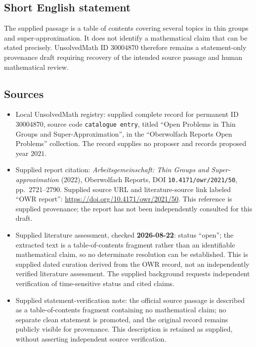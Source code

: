\documentclass[11pt]{article}
\begin{document}
\subsection{Short English statement}
The supplied passage is a table of contents covering several topics in thin groups and super-approximation. It does not identify a mathematical claim that can be stated precisely. UnsolvedMath ID \(30004870\) therefore remains a statement-only provenance draft requiring recovery of the intended source passage and human mathematical review.
\subsection{Sources}
\begin{itemize}
\item Local UnsolvedMath registry: supplied complete record for permanent ID \(30004870\), source code \texttt{catalogue entry}, titled ``Open Problems in Thin Groups and Super-Approximation'', in the ``Oberwolfach Reports Open Problems'' collection. The record supplies no proposer and records proposed year \(2021\).
\item Supplied report citation: \emph{Arbeitsgemeinschaft: Thin Groups and Super-approximation} (2022), Oberwolfach Reports, DOI \texttt{10.4171/owr/2021/50}, pp.~2721--2790. Supplied source URL and literature-source link labeled ``OWR report'': \url{https://doi.org/10.4171/owr/2021/50}. This reference is supplied provenance; the report has not been independently consulted for this draft.
\item Supplied literature assessment, checked \textbf{2026-08-22}: status ``open''; the extracted text is a table-of-contents fragment rather than an identifiable mathematical claim, so no determinate resolution can be established. This is supplied dated curation derived from the OWR record, not an independently verified literature assessment. The supplied background requests independent verification of time-sensitive status and cited claims.
\item Supplied statement-verification note: the official source passage is described as a table-of-contents fragment containing no mathematical claim; no separate clean statement is promoted, and the original record remains publicly visible for provenance. This description is retained as supplied, without asserting independent source verification.
\end{itemize}
\end{document}
